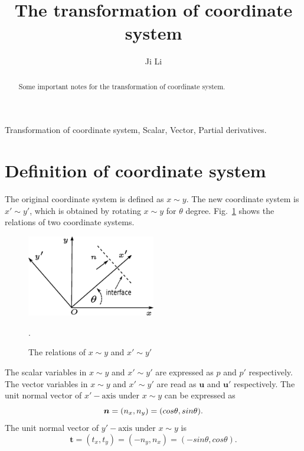 \documentclass[review]{elsarticle}
\begin{document}
\begin{frontmatter}

\title{The transformation of coordinate system}

\author[mysecondaryaddress]{Ji Li}
\address{National Key Laboratory of Science and Technology on Aerodynamic Design and Research, Northwestern Polytechnical University, Xi'an, Shaanxi 710072, China}
\begin{abstract}
	Some important notes for the transformation of coordinate system.
\end{abstract}

\begin{keyword}
	Transformation of coordinate system, Scalar, Vector, Partial derivatives.
\end{keyword}

\end{frontmatter}


\section{Definition of coordinate system}
The original coordinate system is defined as $x\sim y$. The new coordinate system is $x' \sim y'$, which 
is obtained by rotating $x \sim y$ for $\theta$ degree. Fig.~\ref{fig:CoordinateSystemRotation} shows the relations of two coordinate systems. 

\begin{figure}[!htp]
	\centering
	\includegraphics[width=0.5\textwidth]{CoordinateSystemRotation.eps}
	\caption{The relations of $x \sim y$ and $x' \sim y'$}.
	\label{fig:CoordinateSystemRotation}
\end{figure}

The scalar variables in $x \sim y$ and $x' \sim y'$ are expressed as $p$ and $p'$ respectively. The vector variables in $x \sim y$ and $x' \sim y'$ are read as $\bm{u}$ and $\bm{u}'$ respectively.
The unit normal vector of $x'-\text{axis}$ under $x \sim y$ can be expressed as
\begin{equation}\label{normal}
	\bm{n}=(n_x, n_y) = (cos\theta, sin\theta).\\
\end{equation}
The unit normal vector of $y'-\text{axis}$ under $x \sim y$ is
\begin{equation}\label{tangent}
	\bm{t} = (t_x, t_y) = (-n_y, n_x)=(-sin\theta, cos\theta).
\end{equation}
\end{document}
